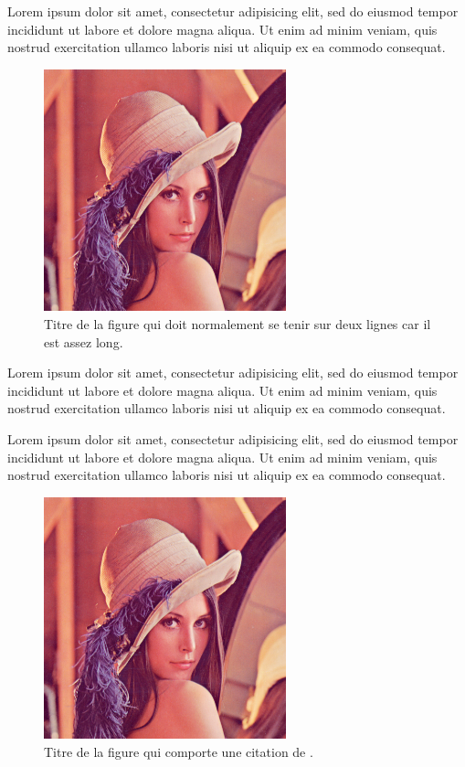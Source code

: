 Lorem ipsum dolor sit amet, consectetur adipisicing elit, sed do eiusmod
tempor incididunt ut labore et dolore magna aliqua. Ut enim ad minim veniam,
quis nostrud exercitation ullamco laboris nisi ut aliquip ex ea commodo
consequat.

\begin{figure}[H]
 \centering
 \includegraphics[width=7cm]{lenna.png}
 \caption{Titre de la figure qui doit normalement se tenir sur deux lignes car il est assez long.}
 \label{fig:figure_long}
\end{figure}

Lorem ipsum dolor sit amet, consectetur adipisicing elit, sed do eiusmod
tempor incididunt ut labore et dolore magna aliqua. Ut enim ad minim veniam,
quis nostrud exercitation ullamco laboris nisi ut aliquip ex ea commodo
consequat.

Lorem ipsum dolor sit amet, consectetur adipisicing elit, sed do eiusmod
tempor incididunt ut labore et dolore magna aliqua. Ut enim ad minim veniam,
quis nostrud exercitation ullamco laboris nisi ut aliquip ex ea commodo
consequat.

\begin{figure}[H]
  \centering
  \includegraphics[width=7cm]{lenna.png}
  \caption[Titre de la figure sans citation]{Titre de la figure qui comporte une citation de \citet{RN6}.}
  \label{fig:figure_short}
 \end{figure}

